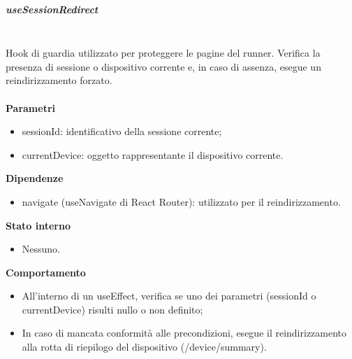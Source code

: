 \documentclass[a4paper,12pt]{article}
\begin{document}
                \subparagraph{useSessionRedirect}\mbox{}\\
                Hook di guardia utilizzato per proteggere le pagine del runner. Verifica la presenza di sessione o dispositivo corrente e, in caso di assenza, esegue un reindirizzamento forzato.\\\\
                \textbf{Parametri}
                \begin{itemize}
                    \item {\ttfamily sessionId}: identificativo della sessione corrente;
                    \item {\ttfamily currentDevice}: oggetto rappresentante il dispositivo corrente.
                \end{itemize}
                \textbf{Dipendenze}
                \begin{itemize}
                    \item {\ttfamily navigate} ({\ttfamily useNavigate} di React Router): utilizzato per il reindirizzamento.
                \end{itemize}
                \textbf{Stato interno}
                \begin{itemize}
                    \item Nessuno.
                \end{itemize}
                \textbf{Comportamento}
                \begin{itemize}
                    \item All'interno di un {\ttfamily useEffect}, verifica se uno dei parametri ({\ttfamily sessionId} o {\ttfamily currentDevice}) risulti nullo o non definito;
                    \item In caso di mancata conformità alle precondizioni, esegue il reindirizzamento alla rotta di riepilogo del dispositivo ({\ttfamily /device/summary}).
                \end{itemize}
                
\end{document}
